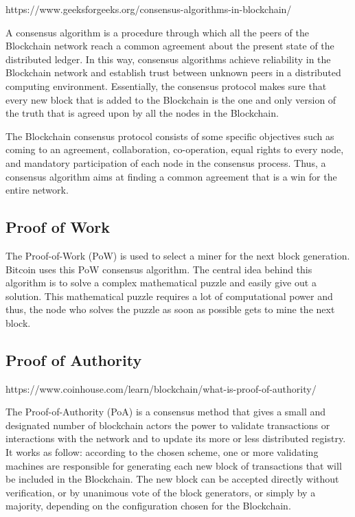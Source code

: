 https://www.geeksforgeeks.org/consensus-algorithms-in-blockchain/

A consensus algorithm is a procedure through which all the peers of the Blockchain network reach a common agreement about the present state of the distributed ledger. In this way, consensus algorithms achieve reliability in the Blockchain network and establish trust between unknown peers in a distributed computing environment. Essentially, the consensus protocol makes sure that every new block that is added to the Blockchain is the one and only version of the truth that is agreed upon by all the nodes in the Blockchain.

The Blockchain consensus protocol consists of some specific objectives such as coming to an agreement, collaboration, co-operation, equal rights to every node, and mandatory participation of each node in the consensus process. Thus, a consensus algorithm aims at finding a common agreement that is a win for the entire network.

\subsection{Proof of Work}

The Proof-of-Work (PoW) is used to select a miner for the next block generation. Bitcoin uses this PoW consensus algorithm. The central idea behind this algorithm is to solve a complex mathematical puzzle and easily give out a solution. This mathematical puzzle requires a lot of computational power and thus, the node who solves the puzzle as soon as possible gets to mine the next block. 

\subsection{Proof of Authority}

https://www.coinhouse.com/learn/blockchain/what-is-proof-of-authority/

The Proof-of-Authority (PoA) is a consensus method that gives a small and designated number of blockchain actors the power to validate transactions or interactions with the network and to update its more or less distributed registry. It works as follow: according to the chosen scheme, one or more validating machines are responsible for generating each new block of transactions that will be included in the Blockchain. The new block can be accepted directly without verification, or by unanimous vote of the block generators, or simply by a majority, depending on the configuration chosen for the Blockchain.